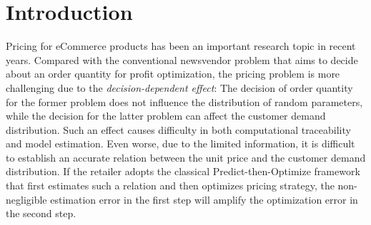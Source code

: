 \documentclass[competition,nonblindrev, 12pt]{informs3-competition}
\theoremstyle{TH}%
\theoremstyle{TH}%
\newcommand{\Jie}[1]{{\textcolor{blue}{#1}}}
\begin{document}
\maketitle

\vspace{-3em}
\section{Introduction}

Pricing for eCommerce products has been an important research topic in recent years.
Compared with the conventional newsvendor problem that aims to decide about an order quantity for profit optimization, the pricing problem is more challenging due to the \emph{decision-dependent effect}: The decision of order quantity for the former problem does not influence the distribution of random parameters, while the decision for the latter problem can affect the customer demand distribution.
Such an effect causes difficulty in both computational traceability and model estimation.
Even worse, due to the limited information, it is difficult to establish an accurate relation between the unit price and the customer demand distribution.
If the retailer adopts the classical Predict-then-Optimize framework~\citep{elmachtoub2022smart} that first estimates such a relation and then optimizes pricing strategy, the non-negligible estimation error in the first step will amplify the optimization error in the second step.
\end{document}
